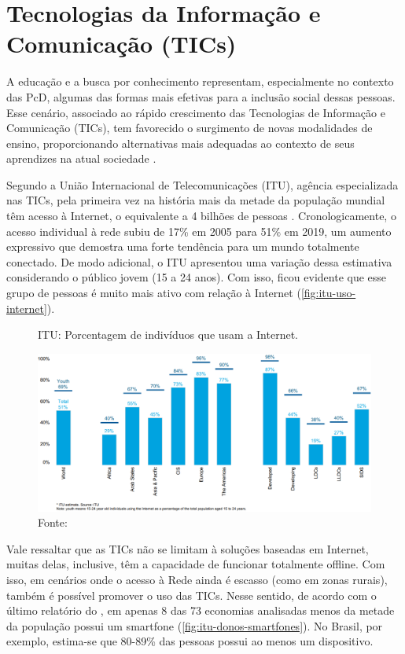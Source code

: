 \section{Tecnologias da Informação e Comunicação (TICs)}
\label{fundamentacao-teorica:tic}

A educação e a busca por conhecimento representam, especialmente no contexto das PcD, algumas das formas mais efetivas para a inclusão social dessas pessoas. Esse cenário, associado ao rápido crescimento das Tecnologias de Informação e Comunicação (TICs), tem favorecido o surgimento de novas modalidades de ensino, proporcionando alternativas mais adequadas ao contexto de seus aprendizes na atual sociedade \cite{Kukulska2005, Castrillo2014}. 

Segundo a União Internacional de Telecomunicações (ITU), agência especializada nas TICs, pela primeira vez na história mais da metade da população mundial têm acesso à Internet, o equivalente a 4 bilhões de pessoas \cite{Itu2020}. Cronologicamente, o acesso individual à rede subiu de 17\% em 2005 para 51\% em 2019, um aumento expressivo que demostra uma forte tendência para um mundo totalmente conectado. De modo adicional, o ITU apresentou uma variação dessa estimativa considerando o público jovem (15 a 24 anos). Com isso, ficou evidente que esse grupo de pessoas é muito mais ativo com relação à Internet (\autoref{fig:itu-uso-internet}).

\begin{figure}[htbp]
\caption{ITU: Porcentagem de indivíduos que usam a Internet.}
\label{fig:itu-uso-internet}
\centerline{\includegraphics[width=1\textwidth]{images/itu-individuals-using-internet.png}}
\caption*{Fonte: }
\end{figure}

Vale ressaltar que as TICs não se limitam à soluções baseadas em Internet, muitas delas, inclusive, têm a capacidade de funcionar totalmente offline. Com isso, em cenários onde o acesso à Rede ainda é escasso (como em zonas rurais), também é possível promover o uso das TICs. Nesse sentido, de acordo com o último relatório do , em apenas 8 das 73 economias analisadas menos da metade da população possui um smartfone (\autoref{fig:itu-donos-smartfones}). No Brasil, por exemplo, estima-se que 80-89\% das pessoas possui ao menos um dispositivo.

